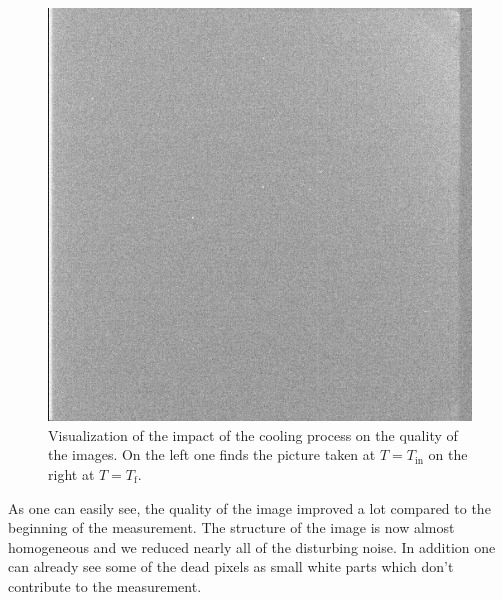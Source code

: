 \begin{figure}[H]
\begin{minipage}{0.35\textwidth}
		\includegraphics[scale=0.17]{figures/Exposures/cooling_end}
	\end{minipage}
	\caption[Impact of the cooling process]{Visualization of the impact of the cooling process on the quality of the images. On the left one finds the picture taken at $T = T_{\text{in}}$ on the right at $T = T_{\text{f}}$.}

\end{figure} 
As one can easily see, the quality of the image improved a lot compared to the beginning of the measurement. The structure of the image is now almost homogeneous and we reduced nearly all of the disturbing noise. In addition one can already see some of the dead pixels as small white parts which don't contribute to the measurement. \\
 
